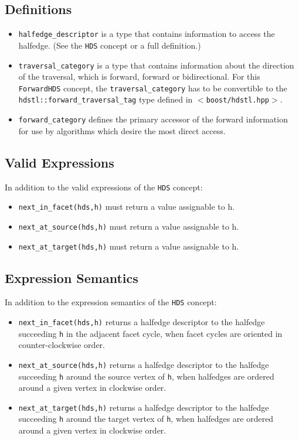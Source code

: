 \subsection{Definitions}\label{forwardhds_refforwardhds5}
\begin{itemize}
\item {\tt halfedge\_\-descriptor} is a type that contains information to access the halfedge. (See the {\tt HDS} concept or a full definition.)\item {\tt traversal\_\-category} is a type that contains information about the direction of the traversal, which is forward, forward or bidirectional. For this {\tt Forward\-HDS} concept, the {\tt traversal\_\-category} has to be convertible to the {\tt hdstl::forward\_\-traversal\_\-tag} type defined in {\tt $<$boost/hdstl.hpp$>$}.\item {\tt forward\_\-category} defines the primary accessor of the forward information for use by algorithms which desire the most direct access.\end{itemize}
\subsection{Valid Expressions}\label{forwardhds_refforwardhds6}
In addition to the valid expressions of the {\tt HDS} concept:\begin{itemize}
\item {\tt next\_\-in\_\-facet(hds,h)} must return a value assignable to h.\item {\tt next\_\-at\_\-source(hds,h)} must return a value assignable to h.\item {\tt next\_\-at\_\-target(hds,h)} must return a value assignable to h.\end{itemize}
\subsection{Expression Semantics}\label{forwardhds_refforwardhds7}
In addition to the expression semantics of the {\tt HDS} concept:\begin{itemize}
\item {\tt next\_\-in\_\-facet(hds,h)} returns a halfedge descriptor to the halfedge succeeding {\tt h} in the adjacent facet cycle, when facet cycles are oriented in counter-clockwise order.\item {\tt next\_\-at\_\-source(hds,h)} returns a halfedge descriptor to the halfedge succeeding {\tt h} around the source vertex of {\tt h}, when halfedges are ordered around a given vertex in clockwise order.\item {\tt next\_\-at\_\-target(hds,h)} returns a halfedge descriptor to the halfedge succeeding {\tt h} around the target vertex of {\tt h}, when halfedges are ordered around a given vertex in clockwise order.\end{itemize}
